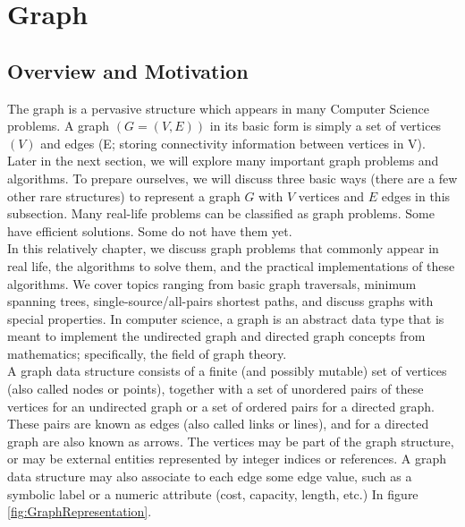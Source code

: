 \chapter{Graph}

\section{Overview and Motivation} 
\label{sec:s1}
   \hspace{7mm}The graph is a pervasive structure which appears in many Computer Science problems. A graph $(G = (V,E))$ in its basic form is simply a set of vertices $(V)$ and edges (E; storing connectivity information between vertices in V). Later in the next section, we will explore many important graph problems and algorithms. To prepare ourselves, we will discuss three basic ways (there are a few other rare structures) to represent a graph $G$ with $V$ vertices and $E$ edges in this subsection. Many real-life problems can be classified as graph problems. Some have efficient solutions. Some do not have them yet.   
   \\
   
   \hspace{7mm}In this relatively chapter, we discuss graph problems that commonly appear in real life, the algorithms to solve them, and the practical implementations of these algorithms. We cover topics ranging from basic graph traversals, minimum spanning trees, single-source/all-pairs shortest paths, and discuss graphs with special properties. In computer science, a graph is an abstract data type that is meant to implement the undirected graph and directed graph concepts from mathematics; specifically, the field of graph theory.    
   \\
   
   \hspace{7mm}A graph data structure consists of a finite (and possibly mutable) set of vertices (also called nodes or points), together with a set of unordered pairs of these vertices for an undirected graph or a set of ordered pairs for a directed graph. These pairs are known as edges (also called links or lines), and for a directed graph are also known as arrows. The vertices may be part of the graph structure, or may be external entities represented by integer indices or references. A graph data structure may also associate to each edge some edge value, such as a symbolic label or a numeric attribute (cost, capacity, length, etc.) In figure \ref{fig:GraphRepresentation}.
\newpage


